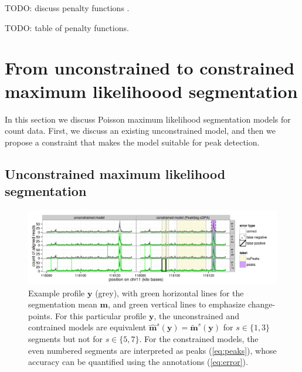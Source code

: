 \documentclass{article}
\begin{document}
TODO: discuss penalty functions \citep{cleynen2013segmentation}.

TODO: table of penalty functions.

\section{From unconstrained to constrained maximum likelihoood
  segmentation}

In this section we discuss Poisson maximum likelihood segmentation
models for count data. First, we discuss an existing unconstrained
model, and then we propose a constraint that makes the model suitable
for peak detection.

\subsection{Unconstrained maximum likelihood segmentation}

\begin{figure}[b!]
  \centering
  \includegraphics[width=\textwidth]{figure-Segmentor-PeakSeg}
  \vskip -0.5cm
  \caption{Example profile $\mathbf y$ (grey), with green horizontal
    lines for the segmentation mean $\mathbf m$, and green vertical
    lines to emphasize change-points. For this particular profile
    $\mathbf y$, the unconstrained and contrained models are
    equivalent $\mathbf{\hat m}^s(\mathbf y) = \mathbf{\tilde
      m}^s(\mathbf y)$ for $s\in\{1, 3\}$ segments but not for
    $s\in\{5, 7\}$. For the constrained models, the even numbered
    segments are interpreted as peaks (\ref{eq:peaks}), whose accuracy
    can be quantified using the annotations (\ref{eq:error}).}
  \label{fig:profiles}
\end{figure}
\end{document}
